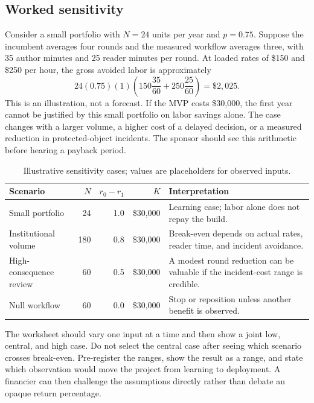 \subsection{Worked sensitivity}

Consider a small portfolio with $N=24$ units per year and $p=0.75$. Suppose
the incumbent averages four rounds and the measured workflow averages three,
with 35 author minutes and 25 reader minutes per round. At loaded rates of
\$150 and \$250 per hour, the gross avoided labor is approximately
\[
  24(0.75)(1)\left(150\frac{35}{60}+250\frac{25}{60}\right)
  =\$2{,}025.
\]
This is an illustration, not a forecast. If the MVP costs \$30,000, the first
year cannot be justified by this small portfolio on labor savings alone. The
case changes with a larger volume, a higher cost of a delayed decision, or a
measured reduction in protected-object incidents. The sponsor should see this
arithmetic before hearing a payback period.

\begin{table}[H]
\centering
\small
\begin{tabularx}{\textwidth}{@{}p{}rrrL@{}}
\toprule
Scenario & $N$ & $r_0-r_1$ & $K$ & Interpretation \\
\midrule
Small portfolio & 24 & 1.0 & \$30,000 & Learning case; labor alone does not
repay the build. \\
Institutional volume & 180 & 0.8 & \$30,000 & Break-even depends on actual
rates, reader time, and incident avoidance. \\
High-consequence review & 60 & 0.5 & \$30,000 & A modest round reduction can
be valuable if the incident-cost range is credible. \\
Null workflow & 60 & 0.0 & \$30,000 & Stop or reposition unless another
benefit is observed. \\
\bottomrule
\end{tabularx}
\caption{Illustrative sensitivity cases; values are placeholders for observed inputs.}
\label{tab:cost-sensitivity-expanded}
\end{table}

The worksheet should vary one input at a time and then show a joint low,
central, and high case. Do not select the central case after seeing which
scenario crosses break-even. Pre-register the ranges, show the result as a
range, and state which observation would move the project from learning to
deployment. A financier can then challenge the assumptions directly rather
than debate an opaque return percentage.

